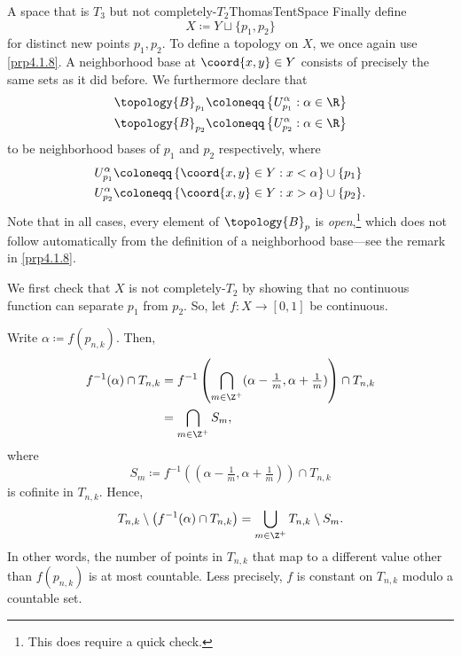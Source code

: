 \begin{exm}{A space that is $T_3$ but not completely-$T_2$}{ThomasTentSpace}
Finally define
\begin{equation}
X\coloneqq Y\sqcup \{ p_1,p_2\}
\end{equation}
for distinct new points $p_1,p_2$.  To define a topology on $X$, we once again use \cref{prp4.1.8}.  A neighborhood base at $\coord{x,y}\in Y$ consists of precisely the same sets as it did before.  We furthermore declare that
\begin{equation}
\begin{split}
\topology{B}_{p_1} & \coloneqq \left\{ U_{p_1}^\alpha :\alpha \in \R \right\} \\
\topology{B}_{p_2} & \coloneqq \left\{ U_{p_2}^\alpha :\alpha \in \R \right\}
\end{split}
\end{equation}
to be neighborhood bases of $p_1$ and $p_2$ respectively, where
\begin{equation}
\begin{split}
U_{p_1}^\alpha & \coloneqq \left\{ \coord{x,y}\in Y:x<\alpha \right\} \cup \{ p_1\} \\
U_{p_2}^\alpha & \coloneqq \left\{ \coord{x,y}\in Y:x>\alpha \right\} \cup \{ p_2\} .
\end{split}
\end{equation}
Note that in all cases, every element of $\topology{B}_p$ is \emph{open},\footnote{This does require a quick check.} which does not follow automatically from the definition of a neighborhood base---see the remark in \cref{prp4.1.8}.

We first check that $X$ is not completely-$T_2$ by showing that no continuous function can separate $p_1$ from $p_2$.  So, let $f\colon X\rightarrow [0,1]$ be continuous.

Write $\alpha \coloneqq f(p_{n,k})$.  Then,
\begin{equation}
\begin{split}
f^{-1}(\alpha )\cap T_{n,k} & =f^{-1}\left( \bigcap _{m\in \Z ^+}(\alpha -\tfrac{1}{m},\alpha +\tfrac{1}{m})\right) \cap T_{n,k} \\
& =\bigcap _{m\in \Z ^+}S_m,
\end{split}
\end{equation}
where
\begin{equation}
S_m\coloneqq f^{-1}((\alpha -\tfrac{1}{m},\alpha +\tfrac{1}{m}))\cap T_{n,k}
\end{equation}
is cofinite in $T_{n,k}$.  Hence,
\begin{equation}
T_{n,k}\setminus \left( f^{-1}(\alpha )\cap T_{n,k}\right) =\bigcup _{m\in \Z ^+}T_{n,k}\setminus S_m.
\end{equation}
In other words, the number of points in $T_{n,k}$ that map to a different value other than $f(p_{n,k})$ is at most countable.  Less precisely, $f$ is constant on $T_{n,k}$ modulo a countable set.


\end{exm}
